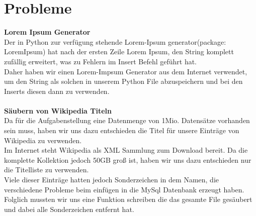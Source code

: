 \documentclass[11pt]{article}
\begin{document}
\section{Probleme}
\textbf{Lorem Ipsum Generator}\\
Der in Python zur verfügung stehende Lorem-Ipsum generator(package: LoremIpsum) hat nach der ersten Zeile Lorem Ipsum, den String komplett zufällig erweitert, was zu Fehlern im Insert Befehl geführt hat.\\
Daher haben wir einen Lorem-Impsum Generator aus dem Internet verwendet, um den String als solchen in unserem Python File abzuspeichern und bei den Inserts diesen dann zu verwenden.\\
\\
\textbf{Säubern von Wikipedia Titeln}\\
Da für die Aufgabenstellung eine Datenmenge von 1Mio. Datensätze vorhanden sein muss, haben wir uns dazu entschieden die Titel für unsere Einträge von Wikipedia zu verwenden.\\
Im Internet steht Wikipedia als XML Sammlung zum Download bereit. Da die komplette Kollektion jedoch 50GB groß ist, haben wir uns dazu entschieden nur die Titelliste zu verwenden.\\
Viele dieser Einträge hatten jedoch Sonderzeichen in dem Namen, die verschiedene Probleme beim einfügen in die MySql Datenbank erzeugt haben. Folglich mussten wir uns eine Funktion schreiben die das gesamte File gesäubert und dabei alle Sonderzeichen entfernt hat.

	
\end{document}
